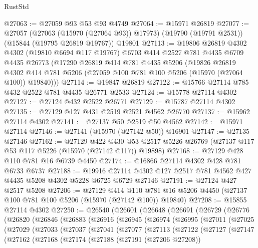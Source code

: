 \begin{lexlean}{RustStd}
\begin{coremodule}
@27063 := @27059 @93 @53 @93 @4749
@27064 := @15971 @26819
@27077 := @27057
    (@27063 (@15970 (@27064 @93)) @17973)
    (@19790 (@19791 @2531))
    (@15844 (@19795 @26819 @19767))
    @19801
@27113 := @19806
    @26819
    @4302
    @4302
    (@19810 @6694 @117 @19767)
    @6703
    @414
    @2527
    @781
    @4435
    @6709
    @4435
    @26773
    (@17290
      @26819
      @414
      @781
      @4435
      @5206
      (@19826
        @26819
        @4302
        @414
        @781
        @5206
        (@27059 @100 @781 @100 @5206 (@15970 (@27064 @100)) @19840)))
@27114 := @19847 @26819
@27122 := @15766 @27114 @785 @432 @2522 @781 @4435 @26771 @2533
@27124 := @15778 @27114 @4302
@27127 := @27124 @432 @2522 @26771
@27129 := @15787 @27114 @4302
@27135 := @27129 @127 @431 @2519 @2521 @4562 @26770
@27137 := @15962 @27114 @4302
@27141 := @27137 @50 @2519 @50 @4562
@27142 := @15971 @27114
@27146 := @27141 (@15970 (@27142 @50)) @16901
@27147 := @27135 @27146
@27162 := @27129
    @422
    @430
    @53
    @2517
    @5226
    @26769
    (@27137 @117 @53 @117 @5226 (@15970 (@27142 @117)) @19898)
@27168 := @27129 @428 @110 @781 @16 @6739 @4450
@27174 := @16866 @27114 @4302 @428 @781 @6733 @6737
@27188 := @19916 @27114 @4302 @127 @2517 @781 @4562 @427 @4435 @5208 @4302 @5228 @6725 @6729 @27146
@27191 := @27124 @427 @2517 @5208
@27206 := @27129
    @414
    @110
    @781
    @16
    @5206
    @4450
    (@27137 @100 @781 @100 @5206 (@15970 (@27142 @100)) @19840)
@27208 := @15855 @27114 @4302
@27250 := @26540
    (@26601
      (@26648
        (@26691
          (@26729
            (@26776
              (@26820
                (@26846
                  (@26883
                    (@26916
                      (@26945
                        (@26974
                          (@26995
                            (@27011
                              (@27025
                                (@27029
                                  (@27033
                                    (@27037
                                      (@27041
                                        (@27077
                                          (@27113
                                            (@27122
                                              (@27127
                                                (@27147
                                                  (@27162
                                                    (@27168
                                                      (@27174
                                                        (@27188
                                                          (@27191 (@27206 @27208))

\end{coremodule}
\end{lexlean}
